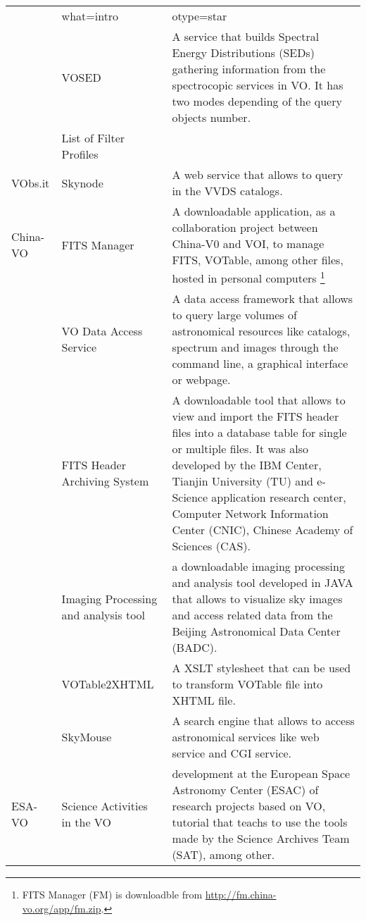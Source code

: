 \begin{table*}[h!t]
\begin{tabular}{|l|l|p{12.5cm}|}
{								\url{http://svo2.cab.inta-csic.es/theory/vosa/helpw.php?action=help2&what=intro&otype=star}}, among other. \\
			& VOSED & A service that builds Spectral Energy Distributions (SEDs) gathering information from the spectrocopic services in VO. It has two
								modes depending of the query objects number. \\
            & List of Filter Profiles & \\
	\hline								 
	VObs.it	
			& Skynode & A web service that allows to query in the VVDS catalogs. \\
	\hline		
	China-VO& FITS Manager & A downloadable application, as a collaboration project between China-V0 and VOI, to manage FITS, VOTable, among other files, 
								hosted in personal computers \footnote{FITS Manager (FM) is downloadble from \url{http://fm.china-vo.org/app/fm.zip}.}  \\
			& VO Data Access Service & A data access framework that allows to query large volumes of astronomical resources like catalogs, spectrum 
									and images through the command line, a graphical interface or webpage.\\
			& FITS Header Archiving System & A downloadable tool that allows to view and import the FITS header files into a database table for single or 
									multiple files. It was also developed by the IBM Center, Tianjin University (TU) and e-Science application research 
									center, Computer Network Information Center (CNIC), Chinese Academy of Sciences (CAS).\\
			& Imaging Processing and analysis tool & a downloadable imaging processing and analysis tool developed in JAVA that allows to visualize sky 
									images and access related data from the Beijing Astronomical Data Center (BADC). \\
			& VOTable2XHTML & A XSLT stylesheet that can be used to transform VOTable file into XHTML file.\\
			& SkyMouse & A search engine that allows to access astronomical services like web service and CGI service. \\
	\hline
	ESA-VO & Science Activities in the VO & development at the European Space
Astronomy Center (ESAC) of research projects based on VO, tutorial that teachs
to use the tools made by the Science Archives Team (SAT), among other.\\

\end{tabular}
\end{table*}
